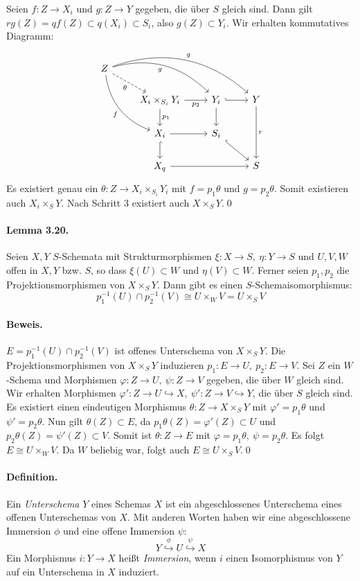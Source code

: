 \begin{enumerate}
Seien $f:Z\to X_i$ und $g:Z\to Y$ gegeben, die über $S$ gleich sind. Dann gilt $rg(Z)=qf(Z)\subset q(X_i)\subset S_i$, also $g(Z)\subset Y_i$. Wir erhalten kommutatives Diagramm:
\[\begin{tikzcd}
Z\ar[ddr, "f"', bend right]\ar[rrd, "g"', bend left]\ar[rrrd, "g", bend left]\ar[rd, "\theta"', dashed]\\
& X_i\times_{S_i}Y_i\ar[r, "p_2"']\ar[d, "p_1"] & Y_i\ar[r, hook]\ar[d] & Y\ar[dd, "r"]\\
& X_i\ar[d, hook]\ar[r] & S_i\ar[dr, hook] &\\
& X\ar[rr]_q & & S
\end{tikzcd} \]
Es existiert genau ein $\theta:Z\to X_i\times_{S_i} Y_i$ mit $f=p_1\theta$ und $g=p_2\theta$. Somit existieren auch $X_i\times_SY$. Nach Schritt 3 existiert auch $X\times_SY$.\qed
\end{enumerate}

\paragraph{Lemma 3.20.}\label{3.20} Seien $X,Y$ $S$-Schemata mit Strukturmorphismen $\xi:X\to S,\ \eta:Y\to S$ und $U,V,W$ offen in $X,Y$ bzw. $S$, so dass $\xi(U)\subset W$ und $\eta(V)\subset W$. Ferner seien $p_1,p_2$ die Projektionsmorphismen von $X\times_SY$. Dann gibt es einen $S$-Schemaisomorphismus:
\[p_1^{-1}(U)\cap p_2^{-1}(V)\cong U\times_WV=U\times_SV \]

\paragraph{Beweis.} $E=p_1^{-1}(U)\cap p_2^{-1}(V)$ ist offenes Unterschema von $X\times_SY$. Die Projektionsmorphismen von $X\times_SY$ induzieren $p_1:E\to U,\ p_2:E\to V$. Sei $Z$ ein $W$-Schema und Morphismen $\varphi:Z\to U,\ \psi:Z\to V$ gegeben, die über $W$ gleich sind. Wir erhalten Morphismen $\varphi':Z\to U\hookrightarrow X,\ \psi':Z\to V\hookrightarrow Y$, die über $S$ gleich sind. Es existiert einen eindeutigen Morphismus $\theta:Z\to X\times_SY$ mit $\varphi'=p_1\theta$ und $\psi'=p_2\theta$. Nun gilt $\theta(Z)\subset E$, da $p_1\theta(Z)=\varphi'(Z)\subset U$ und $p_2\theta(Z)=\psi'(Z)\subset V$. Somit ist $\theta:Z\to E$ mit $\varphi=p_1\theta,\ \psi=p_2\theta$. Es folgt $E\cong U\times_WV$. Da $W$ beliebig war, folgt auch $E\cong U\times_SV$.\qed

\paragraph{Definition.} Ein \textit{Unterschema} $Y$ eines Schemas $X$ ist ein abgeschlossenes Unterschema eines offenen Unterschemas von $X$. Mit anderen Worten haben wir eine abgeschlossene Immersion $\phi$ und eine offene Immersion $\psi$:
\[Y\stackrel{\phi}{\hookrightarrow} U\stackrel{\psi}{\hookrightarrow}X \]
Ein Morphismus $i:Y\to X$ heißt \textit{Immersion}, wenn $i$ einen Isomorphismus von $Y$ auf ein Unterschema in $X$ induziert.

